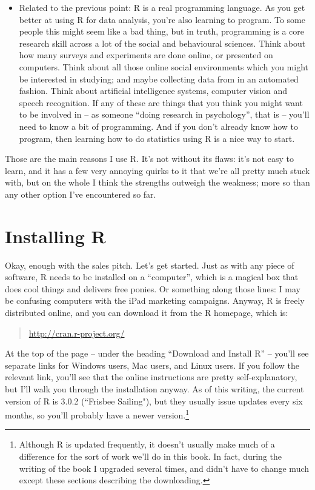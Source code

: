 \documentclass[
]{book}
\begin{document}
\begin{itemize}
\item
  Related to the previous point: R is a real programming language. As you get better at using R for data analysis, you're also learning to program. To some people this might seem like a bad thing, but in truth, programming is a core research skill across a lot of the social and behavioural sciences. Think about how many surveys and experiments are done online, or presented on computers. Think about all those online social environments which you might be interested in studying; and maybe collecting data from in an automated fashion. Think about artificial intelligence systems, computer vision and speech recognition. If any of these are things that you think you might want to be involved in -- as someone ``doing research in psychology'', that is -- you'll need to know a bit of programming. And if you don't already know how to program, then learning how to do statistics using R is a nice way to start.
\end{itemize}

Those are the main reasons I use R. It's not without its flaws: it's not easy to learn, and it has a few very annoying quirks to it that we're all pretty much stuck with, but on the whole I think the strengths outweigh the weakness; more so than any other option I've encountered so far.

\hypertarget{gettingR}{%
\section{Installing R}\label{gettingR}}

Okay, enough with the sales pitch. Let's get started. Just as with any piece of software, R needs to be installed on a ``computer'', which is a magical box that does cool things and delivers free ponies. Or something along those lines: I may be confusing computers with the iPad marketing campaigns. Anyway, R is freely distributed online, and you can download it from the R homepage, which is:

\begin{quote}
\url{http://cran.r-project.org/}
\end{quote}

At the top of the page -- under the heading ``Download and Install R'' -- you'll see separate links for Windows users, Mac users, and Linux users. If you follow the relevant link, you'll see that the online instructions are pretty self-explanatory, but I'll walk you through the installation anyway. As of this writing, the current version of R is 3.0.2 (``Frisbee Sailing"), but they usually issue updates every six months, so you'll probably have a newer version.\footnote{Although R is updated frequently, it doesn't usually make much of a difference for the sort of work we'll do in this book. In fact, during the writing of the book I upgraded several times, and didn't have to change much except these sections describing the downloading.}
\end{document}

